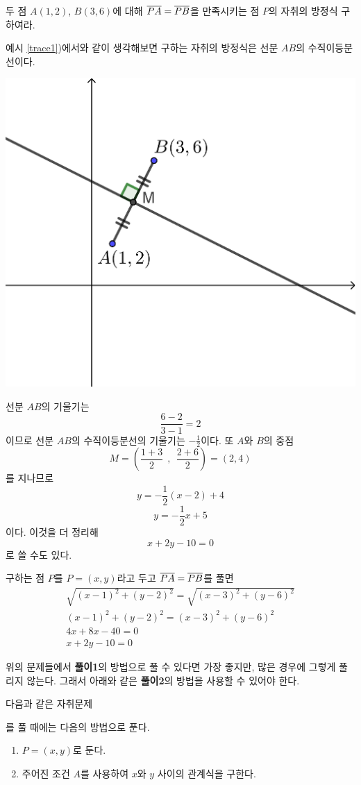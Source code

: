 \documentclass{oblivoir}
\begin{document}
\newpage
%
\exam{}\label{trace2}
두 점 \(A(1,2)\), \(B(3,6)\)에 대해 \(\overline{PA}=\overline{PB}\)을 만족시키는 점 \(P\)의 자취의 방정식 구하여라.
\begin{mdframed}[frametitle=풀이1]
예시 \ref{trace1})에서와 같이 생각해보면 구하는 자취의 방정식은 선분 \(AB\)의 수직이등분선이다.
\begin{center}
\includegraphics[width=.5\textwidth]{trace_2}
\end{center}
선분 \(AB\)의 기울기는
\[\frac{6-2}{3-1}=2\]
이므로 선분 \(AB\)의 수직이등분선의 기울기는 \(-\frac12\)이다.
또 \(A\)와 \(B\)의 중점
\[M=\left(\frac{1+3}2\:\:,\:\:\frac{2+6}2\right)=(2,4)\]
를 지나므로
\[y=-\frac12(x-2)+4\]
\[y=-\frac12x+5\]
이다.
이것을 더 정리해
\[x+2y-10=0\]
로 쓸 수도 있다.
\end{mdframed}
\par
\begin{mdframed}[frametitle=풀이2]
구하는 점 \(P\)를 \(P=(x,y)\)라고 두고
\(\overline{PA}=\overline{PB}\)를 풀면
\begin{gather*}
\sqrt{(x-1)^2+(y-2)^2}=\sqrt{(x-3)^2+(y-6)^2}\\
(x-1)^2+(y-2)^2=(x-3)^2+(y-6)^2\\
4x+8x-40=0\\
x+2y-10=0
\end{gather*}
\end{mdframed}

위의 문제들에서 \textbf{풀이1}의 방법으로 풀 수 있다면 가장 좋지만, 많은 경우에 그렇게 풀리지 않는다. 
그래서 아래와 같은 \textbf{풀이2}의 방법을 사용할 수 있어야 한다.
\begin{mdframed}
%
\label{trace3}
다음과 같은 자취문제
\begin{center}
\end{center}
를 풀 때에는 다음의 방법으로 푼다.
\begin{enumerate}[label=\roman*)]
\item
\(P=(x,y)\)로 둔다.
\item
주어진 조건 \(A\)를 사용하여 \(x\)와 \(y\) 사이의 관계식을 구한다.
\end{enumerate}
\end{mdframed}
\end{document}

